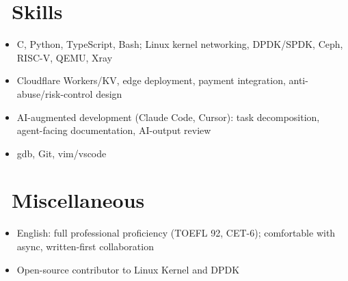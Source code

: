 \documentclass{resume}
\begin{document}
\section{\faWrench\ Skills}
\begin{itemize}[parsep=0.5ex]
  \item C, Python, TypeScript, Bash; Linux kernel networking, DPDK/SPDK, Ceph, RISC-V, QEMU, Xray
  \item Cloudflare Workers/KV, edge deployment, payment integration, anti-abuse/risk-control design
  \item AI-augmented development (Claude Code, Cursor): task decomposition, agent-facing documentation, AI-output review
  \item gdb, Git, vim/vscode
\end{itemize}

\section{\faGlobe\ Miscellaneous}
\begin{itemize}[parsep=0.5ex]
  \item English: full professional proficiency (TOEFL 92, CET-6); comfortable with async, written-first collaboration
  \item Open-source contributor to Linux Kernel and DPDK
\end{itemize}
\end{document}
